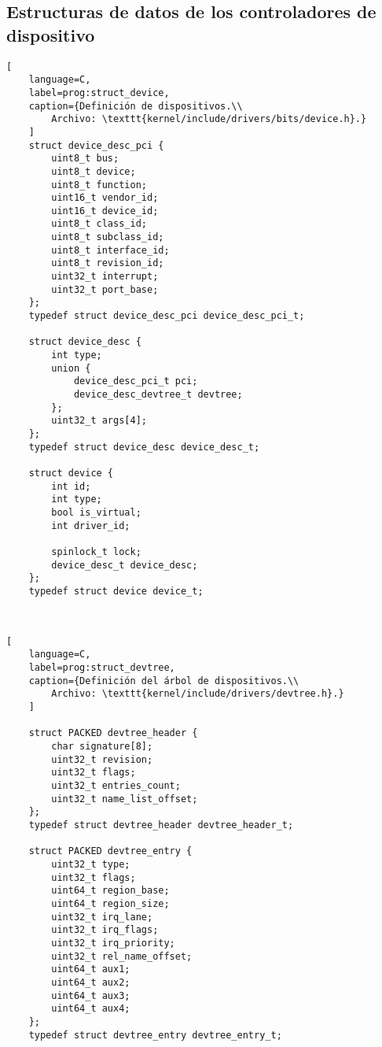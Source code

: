 \subsection{Estructuras de datos de los controladores de dispositivo}
\begin{lstlisting}[
	language=C,
	label=prog:struct_device,
	caption={Definición de dispositivos.\\
		Archivo: \texttt{kernel/include/drivers/bits/device.h}.}
	]
	struct device_desc_pci {
		uint8_t bus;
		uint8_t device;
		uint8_t function;
		uint16_t vendor_id;
		uint16_t device_id;
		uint8_t class_id;
		uint8_t subclass_id;
		uint8_t interface_id;
		uint8_t revision_id;
		uint32_t interrupt;
		uint32_t port_base;
	};
	typedef struct device_desc_pci device_desc_pci_t;
	
	struct device_desc {
		int type;
		union {
			device_desc_pci_t pci;
			device_desc_devtree_t devtree;
		};
		uint32_t args[4];
	};
	typedef struct device_desc device_desc_t;
	
	struct device {
		int id;
		int type;
		bool is_virtual;
		int driver_id;
		
		spinlock_t lock;
		device_desc_t device_desc;
	};
	typedef struct device device_t;
	
	
\end{lstlisting}

\begin{lstlisting}[
	language=C,
	label=prog:struct_devtree,
	caption={Definición del árbol de dispositivos.\\
		Archivo: \texttt{kernel/include/drivers/devtree.h}.}
	]
	
	struct PACKED devtree_header {
		char signature[8];
		uint32_t revision;
		uint32_t flags;
		uint32_t entries_count;
		uint32_t name_list_offset;
	};
	typedef struct devtree_header devtree_header_t;
	
	struct PACKED devtree_entry {
		uint32_t type;
		uint32_t flags;
		uint64_t region_base;
		uint64_t region_size;
		uint32_t irq_lane;
		uint32_t irq_flags;
		uint32_t irq_priority;
		uint32_t rel_name_offset;
		uint64_t aux1;
		uint64_t aux2;
		uint64_t aux3;
		uint64_t aux4;
	};
	typedef struct devtree_entry devtree_entry_t;
\end{lstlisting}




\newpage
